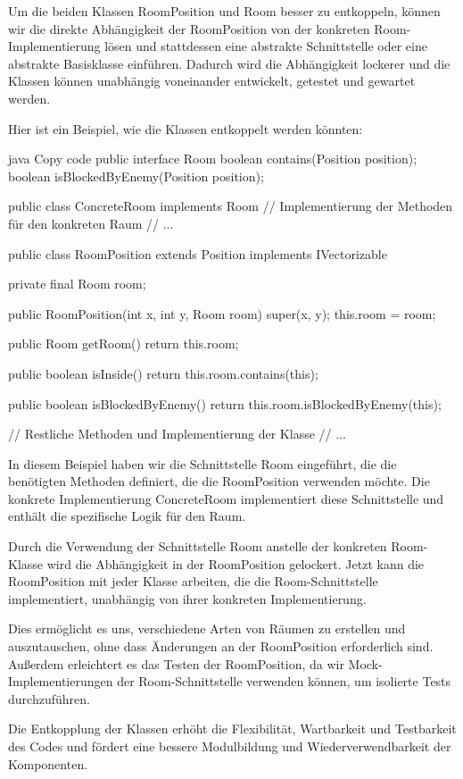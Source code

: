 \iffalse
Um die beiden Klassen RoomPosition und Room besser zu entkoppeln, können wir die direkte Abhängigkeit der RoomPosition von der konkreten Room-Implementierung lösen und stattdessen eine abstrakte Schnittstelle oder eine abstrakte Basisklasse einführen. Dadurch wird die Abhängigkeit lockerer und die Klassen können unabhängig voneinander entwickelt, getestet und gewartet werden.

Hier ist ein Beispiel, wie die Klassen entkoppelt werden könnten:

java
Copy code
public interface Room {
    boolean contains(Position position);
    boolean isBlockedByEnemy(Position position);
}

public class ConcreteRoom implements Room {
    // Implementierung der Methoden für den konkreten Raum
    // ...
}

public class RoomPosition extends Position implements IVectorizable {
    private final Room room;

    public RoomPosition(int x, int y, Room room) {
        super(x, y);
        this.room = room;
    }

    public Room getRoom() {
        return this.room;
    }

    public boolean isInside() {
        return this.room.contains(this);
    }

    public boolean isBlockedByEnemy() {
        return this.room.isBlockedByEnemy(this);
    }

    // Restliche Methoden und Implementierung der Klasse
    // ...
}
In diesem Beispiel haben wir die Schnittstelle Room eingeführt, die die benötigten Methoden definiert, die die RoomPosition verwenden möchte. Die konkrete Implementierung ConcreteRoom implementiert diese Schnittstelle und enthält die spezifische Logik für den Raum.

Durch die Verwendung der Schnittstelle Room anstelle der konkreten Room-Klasse wird die Abhängigkeit in der RoomPosition gelockert. Jetzt kann die RoomPosition mit jeder Klasse arbeiten, die die Room-Schnittstelle implementiert, unabhängig von ihrer konkreten Implementierung.

Dies ermöglicht es uns, verschiedene Arten von Räumen zu erstellen und auszutauschen, ohne dass Änderungen an der RoomPosition erforderlich sind. Außerdem erleichtert es das Testen der RoomPosition, da wir Mock-Implementierungen der Room-Schnittstelle verwenden können, um isolierte Tests durchzuführen.

Die Entkopplung der Klassen erhöht die Flexibilität, Wartbarkeit und Testbarkeit des Codes und fördert eine bessere Modulbildung und Wiederverwendbarkeit der Komponenten.

